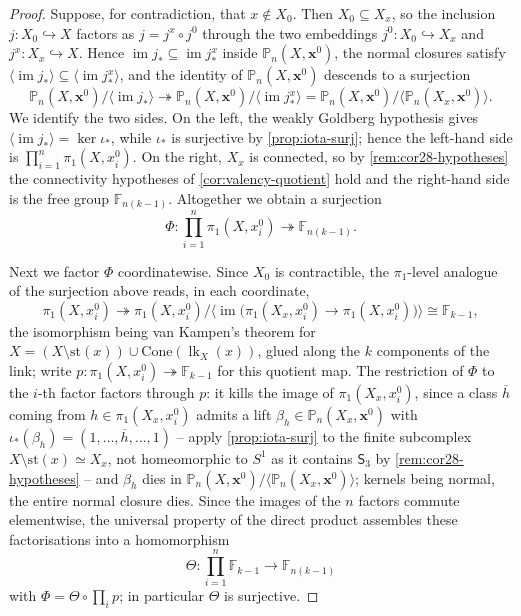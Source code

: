 \documentclass[reqno]{amsart}
\theoremstyle{definition}
\newcommand\bfx{\mathbf{x}}
\newcommand\sfS{\mathsf{S}}
\newcommand{\PB}{\mathbb{P}}
\newcommand{\im}{\operatorname{im}}
\newcommand{\co}[1]{\mathopen{\langle}#1\mathclose{\rangle}} %
\newcommand{\base}{\bfx^0}
\renewcommand{\bar}{\overline}
\DeclareMathOperator{\lk}{lk}
\numberwithin{equation}{section}
\begin{document}
\begin{proof}
Suppose, for contradiction, that \(x\notin X_0\). Then
\(X_0\subseteq X_x\), so the inclusion \(j\colon X_0\hookrightarrow X\)
factors as \(j=j^x\circ j^0\) through the two embeddings
\(j^0\colon X_0\hookrightarrow X_x\) and
\(j^x\colon X_x\hookrightarrow X\). Hence
\(\im j_\ast\subseteq\im j^x_\ast\) inside \(\PB_n(X,\base)\), the
normal closures satisfy
\(\co{\im j_\ast}\subseteq\co{\im j^x_\ast}\), and the identity of
\(\PB_n(X,\base)\) descends to a surjection
\[
\PB_n(X,\base)\big/\co{\im j_\ast}
\twoheadrightarrow
\PB_n(X,\base)\big/\co{\im j^x_\ast}
=
\PB_n(X,\base)\big/\co{\PB_n(X_x,\base)} .
\]
We identify the two sides. On the left, the weakly Goldberg
hypothesis gives \(\co{\im j_\ast}=\ker\iota_\ast\), while
\(\iota_\ast\) is surjective by \cref{prop:iota-surj}; hence
the left-hand side is \(\prod_{i=1}^n\pi_1(X,x_i^0)\). On the right,
\(X_x\) is connected, so by \cref{rem:cor28-hypotheses} the
connectivity hypotheses of \cref{cor:valency-quotient}
hold and the right-hand side is the free group
\(\mathbb{F}_{n(k-1)}\). Altogether we obtain a surjection
\[
\Phi\colon\prod_{i=1}^n\pi_1(X,x_i^0)
\twoheadrightarrow\mathbb{F}_{n(k-1)} .
\]

Next we factor \(\Phi\) coordinatewise. Since \(X_0\) is contractible,
the \(\pi_1\)-level analogue of the surjection above reads, in each
coordinate,
\[
\pi_1(X,x_i^0)
\twoheadrightarrow
\pi_1(X,x_i^0)\big/
\co{\im\bigl(\pi_1(X_x,x_i^0)\to\pi_1(X,x_i^0)\bigr)}
\cong\mathbb{F}_{k-1},
\]
the isomorphism being van Kampen's theorem for
\(X=(X\setminus\mathrm{st}(x))\cup\mathrm{Cone}(\lk_X(x))\), glued
along the \(k\) components of the link; write
\(p\colon\pi_1(X,x_i^0)\twoheadrightarrow\mathbb{F}_{k-1}\) for this
quotient map. The restriction of \(\Phi\) to the \(i\)-th factor
factors through \(p\): it kills the image of \(\pi_1(X_x,x_i^0)\),
since a class \(\bar h\) coming from \(h\in\pi_1(X_x,x_i^0)\) admits a
lift \(\beta_h\in\PB_n(X_x,\base)\) with
\(\iota_\ast(\beta_h)=(1,\dots,\bar h,\dots,1)\) -- apply
\cref{prop:iota-surj} to the finite subcomplex
\(X\setminus\mathrm{st}(x)\simeq X_x\), not homeomorphic to \(S^1\) as
it contains \(\sfS_3\) by \cref{rem:cor28-hypotheses} --
and \(\beta_h\) dies in
\(\PB_n(X,\base)\big/\co{\PB_n(X_x,\base)}\); kernels being normal,
the entire normal closure dies. Since the images of the \(n\)
factors commute elementwise, the universal property of the direct
product assembles these factorisations into a homomorphism
\[
\Theta\colon\prod_{i=1}^n\mathbb{F}_{k-1}
\longrightarrow\mathbb{F}_{n(k-1)}
\]
with \(\Phi=\Theta\circ\prod_ip\); in particular \(\Theta\) is
surjective.


\end{proof}
\end{document}
